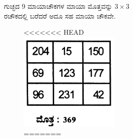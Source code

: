 \begin{figure}[H]
\begin{figure}[H]
\begin{figure}[h]
ಗುಚ್ಛದ 9 ಮಾಯಾಚೌಕಗಳ ಮಾಯಾ ಮೊತ್ತವನ್ನು $3 \times 3$ರಚೌಕದಲ್ಲಿ ಬರೆದರೆ ಅದೂ ಸಹ ಮಾಯಾ ಚೌಕವೇ.
\begin{figure}[h]
<<<<<<< HEAD
\includegraphics{src/figures/chap3/fig3-32.jpg}
=======

\end{figure}
\end{figure}
\end{figure}
\end{figure}
